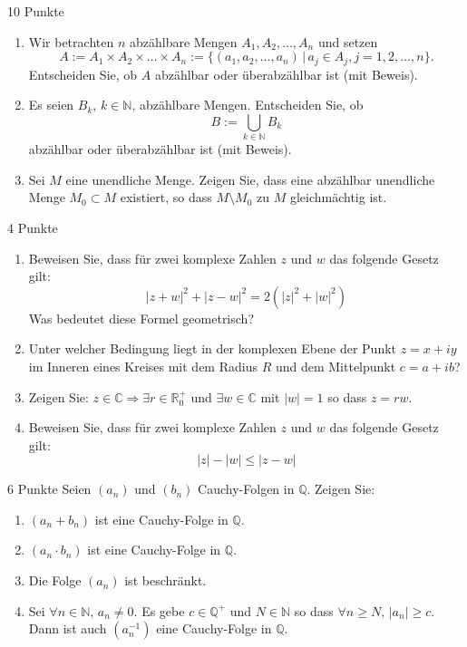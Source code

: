 \documentclass{../problemset}
\author{Michael van Straten}
\begin{document}
\maketitle


\begin{problem}{10 Punkte}
\begin{enumerate}
	\item Wir betrachten $n$ abzählbare Mengen $A_1, A_2, \ldots, A_n$ und setzen
	      \[ A := A_1 \times A_2 \times \ldots \times A_n := \{(a_1, a_2, \ldots, a_n) \,|\, a_j \in A_j, j = 1, 2, \ldots, n\}. \]
	      Entscheiden Sie, ob $A$ abzählbar oder überabzählbar ist (mit Beweis).
	\item Es seien $B_k$, $k \in \mathbb{N}$, abzählbare Mengen. Entscheiden Sie, ob
	      \[ B := \bigcup_{k \in \mathbb{N}} B_k \]
	      abzählbar oder überabzählbar ist (mit Beweis).
	\item Sei $M$ eine unendliche Menge. Zeigen Sie, dass eine abzählbar unendliche Menge $M_0 \subset M$ existiert, so dass $M \setminus M_0$ zu $M$ gleichmächtig ist.
\end{enumerate}
\end{problem}

\begin{problem}{4 Punkte}
\begin{enumerate}
	\item Beweisen Sie, dass für zwei komplexe Zahlen $z$ und $w$ das folgende Gesetz gilt:
	      \[ |z + w|^2 + |z - w|^2 = 2(|z|^2 + |w|^2) \]
	      Was bedeutet diese Formel geometrisch?
	\item Unter welcher Bedingung liegt in der komplexen Ebene der Punkt $z = x + iy$ im Inneren eines Kreises mit dem Radius $R$ und dem Mittelpunkt $c = a + ib$?
	\item Zeigen Sie: $z \in \mathbb{C} \Rightarrow \exists r \in \mathbb{R}^+_0$ und $\exists w \in \mathbb{C}$ mit $|w| = 1$ so dass $z = rw$.
	\item Beweisen Sie, dass für zwei komplexe Zahlen $z$ und $w$ das folgende Gesetz gilt:
	      \[ |z| - |w| \leq |z - w| \]
\end{enumerate}
\end{problem}

\begin{problem}{6 Punkte}
Seien $(a_n)$ und $(b_n)$ Cauchy-Folgen in $\mathbb{Q}$. Zeigen Sie:
\begin{enumerate}
	\item $(a_n + b_n)$ ist eine Cauchy-Folge in $\mathbb{Q}$.
	\item $(a_n \cdot b_n)$ ist eine Cauchy-Folge in $\mathbb{Q}$.
	\item Die Folge $(a_n)$ ist beschränkt.
	\item Sei $\forall n \in \mathbb{N},\, a_n \neq 0$. Es gebe $c \in \mathbb{Q}^+$ und $N \in \mathbb{N}$ so dass $\forall n \geq N,\, |a_n| \geq c$. Dann ist auch $(a_n^{-1})$ eine Cauchy-Folge in $\mathbb{Q}$.
\end{enumerate}
\end{problem}
\end{document}
